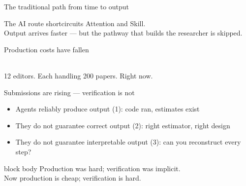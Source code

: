 \documentclass[aspectratio=169,11pt]{beamer}
\newcommand{\emphbox}[1]{%
  \begin{beamercolorbox}[rounded=true,sep=7pt,wd=\linewidth]{block body}%
    \small\color{slate} #1%
  \end{beamercolorbox}}
\begin{document}
\begin{frame}{The traditional path from time to output}
\vspace{0.8em}
\begin{center}
\end{center}
\vspace{0.5em}
\begin{center}\color{warmgray}\small
The AI route shortcircuits Attention and Skill.\\
Output arrives faster --- but the pathway that builds the researcher is skipped.
\end{center}
\end{frame}

\begin{frame}{Production costs have fallen}
\vspace{1.0em}
\begin{center}
\large
{}\\[0.8em]
\color{warmgray}\normalsize
12 editors. Each handling 200 papers. Right now.
\end{center}
\end{frame}

\begin{frame}{Submissions are rising --- verification is not}
\vspace{0.8em}
\begin{itemize}\setlength\itemsep{0.6em}
  \item Agents reliably produce output (1): code ran, estimates exist
  \item They do not guarantee correct output (2): right estimator, right design
  \item They do not guarantee interpretable output (3): can you reconstruct every step?
\end{itemize}
\vspace{0.5em}
\emphbox{Production was hard; verification was implicit. \\Now production is cheap; verification is hard.}
\end{frame}
\end{document}
